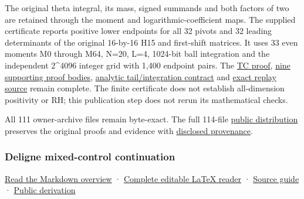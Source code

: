 \documentclass[
]{article}
\begin{document}
The original theta integral, its mass, signed summands and both factors
of two are retained through the moment and logarithmic-coefficient maps.
The supplied certificate reports positive lower endpoints for all 32
pivots and 32 leading determinants of the original 16-by-16 H15 and
first-shift matrices. It uses 33 even moments M0 through M64, N=20, L=4,
1024-bit ball integration and the independent 2\^{}4096 integer grid
with 1,400 endpoint pairs. The
\href{workbenches/splitzero-tandem/continuations/20260913-accepted-followups/original-theta-certification/proofs/TC.tex}{TC
proof},
\href{workbenches/splitzero-tandem/continuations/20260913-accepted-followups/original-theta-certification/support_reader/main.tex}{nine
supporting proof bodies},
\href{workbenches/splitzero-tandem/continuations/20260913-accepted-followups/original-theta-certification/calculation/CERTIFIED_ORIGINAL_THETA_HANKEL.md}{analytic
tail/integration contract} and
\href{workbenches/splitzero-tandem/continuations/20260913-accepted-followups/original-theta-certification/verify_exact_rational.py}{exact
replay source} remain complete. The finite certificate does not
establish all-dimension positivity or RH; this publication step does not
rerun its mathematical checks.

All 111 owner-archive files remain byte-exact. The full 114-file
\href{workbenches/splitzero-tandem/continuations/20260913-accepted-followups/original-theta-certification/DERIVATIVE_MANIFEST.json}{public
distribution} preserves the original proofs and evidence with
\href{workbenches/splitzero-tandem/continuations/20260913-accepted-followups/original-theta-certification/PUBLIC_PROVENANCE.json}{disclosed
provenance}.

\subsubsection{Deligne mixed-control
continuation}\label{deligne-mixed-control-continuation}

\href{workbenches/splitzero-tandem/continuations/20260913-accepted-followups/deligne-mixed-control/DELIGNE_USAGE_OVERVIEW.md}{Read
the Markdown overview} ·
\href{workbenches/splitzero-tandem/continuations/20260913-accepted-followups/deligne-mixed-control/COMPLETE_CONTROL_WORK.tex}{Complete
editable LaTeX reader} ·
\href{workbenches/splitzero-tandem/continuations/20260913-accepted-followups/deligne-mixed-control/README.md}{Source
guide} ·
\href{workbenches/splitzero-tandem/continuations/20260913-accepted-followups/deligne-mixed-control/PUBLIC_DERIVATION.md}{Public
derivation}
\end{document}
